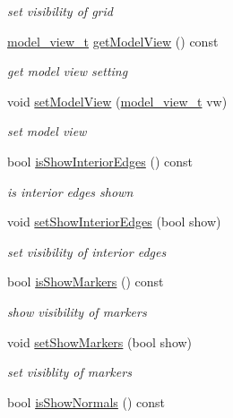 \begin{DoxyCompactItemize}
\begin{DoxyCompactList}\small\item\em set visibility of grid \end{DoxyCompactList}\item 
\hyperlink{namespaceShipCAD_a742f9cd95e62e207769e17467ecd5bb7}{model\-\_\-view\-\_\-t} \hyperlink{classShipCAD_1_1Visibility_a34d56f9e9467b9749c6b50adfe8a0493}{get\-Model\-View} () const 
\begin{DoxyCompactList}\small\item\em get model view setting \end{DoxyCompactList}\item 
void \hyperlink{classShipCAD_1_1Visibility_a017115fc25ec3a7363033dcca873f38f}{set\-Model\-View} (\hyperlink{namespaceShipCAD_a742f9cd95e62e207769e17467ecd5bb7}{model\-\_\-view\-\_\-t} vw)
\begin{DoxyCompactList}\small\item\em set model view \end{DoxyCompactList}\item 
bool \hyperlink{classShipCAD_1_1Visibility_a63588a3b8aa0a7dd37b19173a4802b47}{is\-Show\-Interior\-Edges} () const 
\begin{DoxyCompactList}\small\item\em is interior edges shown \end{DoxyCompactList}\item 
void \hyperlink{classShipCAD_1_1Visibility_a2ce6cd0c56750e6638b5e195e6bc5590}{set\-Show\-Interior\-Edges} (bool show)
\begin{DoxyCompactList}\small\item\em set visibility of interior edges \end{DoxyCompactList}\item 
bool \hyperlink{classShipCAD_1_1Visibility_adae35f2eb31f5d468674ab9856a39637}{is\-Show\-Markers} () const 
\begin{DoxyCompactList}\small\item\em show visibility of markers \end{DoxyCompactList}\item 
void \hyperlink{classShipCAD_1_1Visibility_a04cd6f732b4334070aef1f43b457d472}{set\-Show\-Markers} (bool show)
\begin{DoxyCompactList}\small\item\em set visiblity of markers \end{DoxyCompactList}\item 
bool \hyperlink{classShipCAD_1_1Visibility_a973f63d7828898c1499607a8d87b430d}{is\-Show\-Normals} () const 

\end{DoxyCompactItemize}
